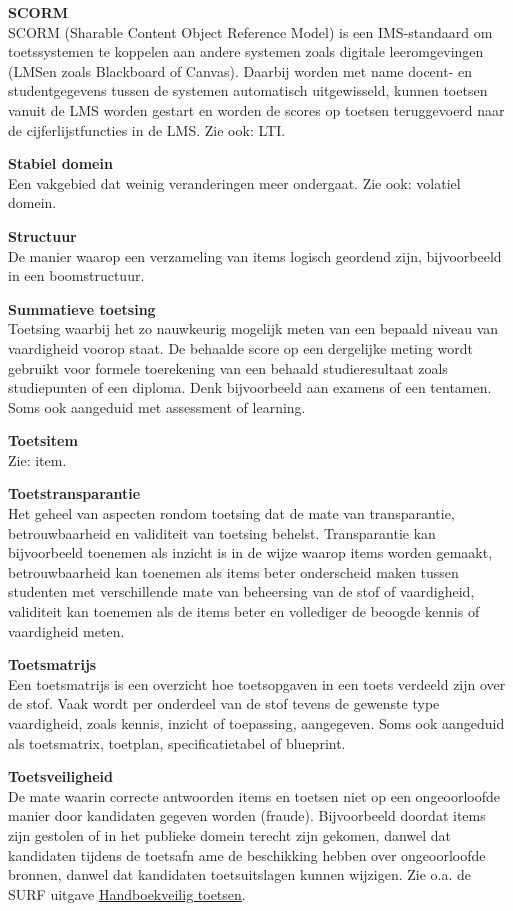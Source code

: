 \documentclass[
]{book}
\begin{document}
\textbf{SCORM}\\
SCORM (Sharable Content Object Reference Model) is een IMS-standaard om toetssystemen te koppelen aan andere systemen zoals digitale leeromgevingen (LMSen zoals Blackboard of Canvas). Daarbij worden met name docent- en studentgegevens tussen de systemen automatisch uitgewisseld, kunnen toetsen vanuit de LMS worden gestart en worden de scores op toetsen teruggevoerd naar de cijferlijstfuncties in de LMS. Zie ook: LTI.

\textbf{Stabiel domein}\\
Een vakgebied dat weinig veranderingen meer ondergaat. Zie ook: volatiel domein.

\textbf{Structuur}\\
De manier waarop een verzameling van items logisch geordend zijn, bijvoorbeeld in een boomstructuur.

\textbf{Summatieve toetsing}\\
Toetsing waarbij het zo nauwkeurig mogelijk meten van een bepaald niveau van vaardigheid voorop staat. De behaalde score op een dergelijke meting wordt gebruikt voor formele toerekening van een behaald studieresultaat zoals studiepunten of een diploma. Denk bijvoorbeeld aan examens of een tentamen. Soms ook aangeduid met assessment of learning.

\textbf{Toetsitem}\\
Zie: item.

\textbf{Toetstransparantie}\\
Het geheel van aspecten rondom toetsing dat de mate van transparantie, betrouwbaarheid en validiteit van toetsing behelst. Transparantie kan bijvoorbeeld toenemen als inzicht is in de wijze waarop items worden gemaakt, betrouwbaarheid kan toenemen als items beter onderscheid maken tussen studenten met verschillende mate van beheersing van de stof of vaardigheid,
validiteit kan toenemen als de items beter en vollediger de beoogde kennis of vaardigheid meten.

\textbf{Toetsmatrijs}\\
Een toetsmatrijs is een overzicht hoe toetsopgaven in een toets verdeeld zijn over de stof. Vaak wordt per onderdeel van de stof tevens de gewenste type vaardigheid, zoals kennis, inzicht of toepassing, aangegeven. Soms ook aangeduid als toetsmatrix, toetplan, specificatietabel of blueprint.

\textbf{Toetsveiligheid}\\
De mate waarin correcte antwoorden items en toetsen niet op een ongeoorloofde manier door kandidaten gegeven worden (fraude). Bijvoorbeeld doordat items zijn gestolen of in het publieke domein terecht zijn gekomen, danwel dat kandidaten tijdens de toetsafn ame de beschikking hebben over ongeoorloofde bronnen, danwel dat kandidaten toetsuitslagen kunnen wijzigen. Zie o.a. de SURF uitgave \href{https://www.surf.nl/werkboek-veilig-toetsen}{Handboekveilig toetsen}.
\end{document}
